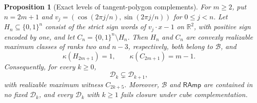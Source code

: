 \documentclass[11pt]{article}
\newtheorem{proposition}{Proposition}[section]
\theoremstyle{definition}
\newcommand{\bits}{\{0,1\}}
\newcommand{\RAmp}{\mathsf{RAmp}}
\begin{document}
\begin{proposition}[Exact levels of tangent-polygon complements]
\label{prop:polygon-decomposition}
For $m\ge2$, put $n=2m+1$ and
$v_j=(\cos(2\pi j/n),\sin(2\pi j/n))$ for $0\le j<n$.
Let $H_n\subseteq\bits^n$ consist of the strict sign words of
$v_j\cdot x-1$ on $\mathbb R^2$, with positive sign encoded by one,
and let $C_n=\bits^n\setminus H_n$. Then $H_n$ and $C_n$ are
convexly realizable maximum classes of ranks two and $n-3$, respectively,
both belong to $\mathcal B$, and
\begin{equation}\label{eq:exact-polygon-level}
 \kappa(H_{2m+1})=1,\qquad \kappa(C_{2m+1})=m-1.
\end{equation}
Consequently, for every $k\ge0$,
\[
 \mathcal D_k\subsetneq\mathcal D_{k+1},
\]
with realizable maximum witness $C_{2k+5}$.
Moreover, $\mathcal B$ and $\RAmp$ are contained in no fixed
$\mathcal D_k$, and every $\mathcal D_k$ with $k\ge1$ fails
closure under cube complementation.
\end{proposition}
\end{document}
